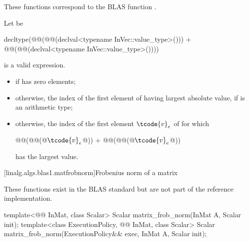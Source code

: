 \begin{itemdescr}
\pnum
\begin{note}
These functions correspond to the BLAS function \supercite{blas1}.
\end{note}

\pnum
Let  be
\begin{codeblock}
decltype(@@(@@(declval<typename InVec::value_type>())) +
         @@(@@(declval<typename InVec::value_type>())))
\end{codeblock}

\pnum
\mandates
{} is a valid expression.

\pnum
\returns
\begin{itemize}
\item
{}
      if  has zero elements;
\item
otherwise, the index of the first element of 
having largest absolute value,
if  is an arithmetic type;
\item
otherwise, the index of the first element $\tcode{v}_e$ of 
for which
\begin{codeblock}
@@(@@(@$\tcode{v}_e$@)) + @@(@@(@$\tcode{v}_e$@))
\end{codeblock}
has the largest value.
\end{itemize}
\end{itemdescr}

[linalg.algs.blas1.matfrobnorm]{Frobenius norm of a matrix}

\pnum
\begin{note}
These functions exist in the BLAS standard\supercite{blas-std}
but are not part of the reference implementation.
\end{note}

%
\begin{itemdecl}
template<@@ InMat, class Scalar>
  Scalar matrix_frob_norm(InMat A, Scalar init);
template<class ExecutionPolicy, @@ InMat, class Scalar>
  Scalar matrix_frob_norm(ExecutionPolicy&& exec, InMat A, Scalar init);
\end{itemdecl}

